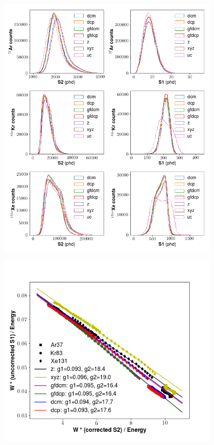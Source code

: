 \begin{figure}[h!]
\centering
\includegraphics[width=150mm]{Figures/S1S2_spectra.png}
\caption{}
\label{fig:S1S2_spectra} 
\end{figure}


\begin{figure}[h!]
\centering
\includegraphics[width=150mm]{Figures/dt_doke_plot.png}
\caption{}
\label{fig:dt_doke_plot} 
\end{figure}

